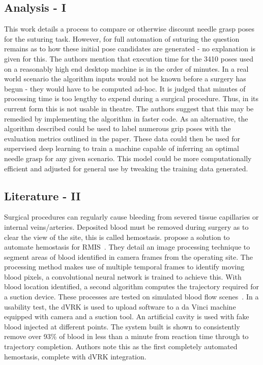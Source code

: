 \documentclass[english]{sobraep}
\begin{document}
\subsection{Analysis - I}
This work details a process to compare or otherwise discount needle grasp poses for the suturing task. However, for full automation of suturing the question remains as to how these initial pose candidates are generated - no explanation is given for this. The authors mention that execution time for the 3410 poses used on a reasonably high end desktop machine is in the order of minutes. In a real world scenario the algorithm inputs would not be known before a surgery has begun - they would have to be computed ad-hoc. It is judged that minutes of processing time is too lengthy to expend during a surgical procedure. Thus, in its current form this is not usable in theatre. The authors suggest that this may be remedied by implementing the algorithm in faster code. As an alternative, the algorithm described could be used to label numerous grip poses with the evaluation metrics outlined in the paper. These data could then be used for supervised deep learning to train a machine capable of inferring an optimal needle grasp for any given scenario. This model could be more computationally efficient and adjusted for general use by tweaking the training data generated.    
\subsection{Literature - II}
Surgical procedures can regularly cause bleeding from severed tissue capillaries or internal veins/arteries. Deposited blood must be removed during surgery as to clear the view of the site, this is called hemostasis. \citeauthor{blood-suck} propose a solution to automate hemostasis for RMIS~\cite{blood-suck}. They detail an image processing technique to segment areas of blood identified in camera frames from the operating site. The processing method makes use of multiple temporal frames to identify moving blood pixels, a convolutional neural network is trained to achieve this. With blood location identified, a second algorithm computes the trajectory required for a suction device. These processes are tested on simulated blood flow scenes~\cite[Figure 4]{blood-suck}. In a usability test, the dVRK is used to upload software to a da Vinci machine equipped with camera and a suction tool. An artificial cavity is used with fake blood injected at different points. The system built is shown to consistently remove over 93\% of blood in less than a minute from reaction time through to trajectory completion. Authors note this as the first completely automated hemostasis, complete with dVRK integration. 
\end{document}
